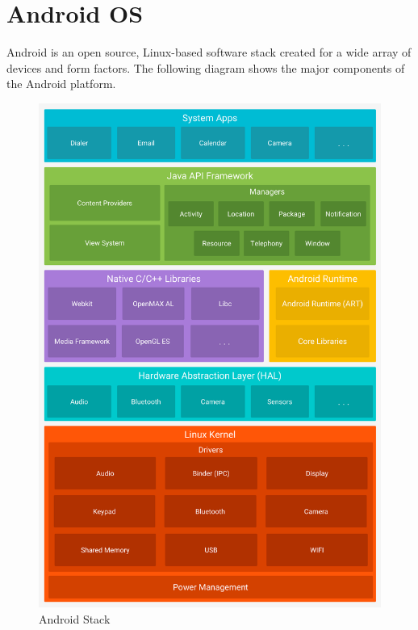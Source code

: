 

\section{Android OS}
\label{sec:01androidos}
Android is an open source, Linux-based software stack created for a wide array of devices and form factors. The following diagram shows the major components of the Android platform.

\begin{figure}[h]
\includegraphics[scale=0.18]{img/android-stack_2x.png}
\centering
\caption{Android Stack}
\end{figure}

